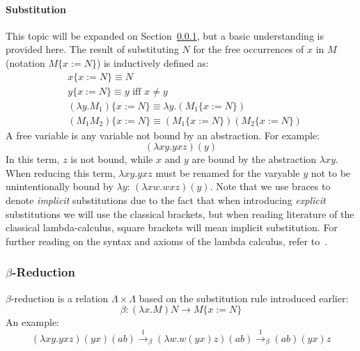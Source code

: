 \documentclass[11pt]{article}
\begin{document}
\paragraph{Substitution} This topic will be expanded on Section~\ref{reduction}, but a basic understanding is provided here.
The result of substituting $N$ for the free occurrences of $x$ in $M$ (notation $M \{ x:= N \} $) is inductively defined as:
\begin{equation*}
  \begin{split}
    & x\{ x := N \} \equiv N \\
    & y \{ x := N \} \equiv y \text{ iff } x \neq y \\
    & (\lambda y.M_{1}) \{ x:=N \} \equiv \lambda y. ( M_{1} \{ x:=N \} ) \\
    & (M_{1}M_{2}) \{ x:=N \} \equiv (M_{1}\{ x:=N \} )(M_{2} \{ x:=N \} )
  \end{split}
\end{equation*}
A free variable is any variable not bound by an abstraction. For example:
\begin{equation*}
  (\lambda x y . y x z ) (y)
\end{equation*}
In this term, $z$ is not bound,  while $x$ and $y$ are bound by the abstraction $\lambda xy$. When reducing this term, $\lambda x y . y x z$ must be renamed for the varyable $y$ not to be unintentionally bound
 by $\lambda y$: $(\lambda x w . w x z) (y)$.
Note that we use braces to denote \textit{implicit} substitutions due to the fact that when introducing \textit{explicit} substitutions we will use the classical brackets, but when reading literature of the classical lambda-calculus, square brackets will mean implicit substitution.
For further reading on the syntax and axioms of the lambda calculus, refer to~\cite{barendregt1984lambda}.

\subsubsection{$\beta$-Reduction}\label{reduction}
$\beta$-reduction is a relation $\Lambda \times \Lambda$ based on the substitution rule introduced earlier:
\begin{equation}
	\beta : ( \lambda x.M ) N \rightarrow M \{ x:=N \}
\end{equation}
An example:
\begin{equation*}
  ( \lambda xy. yxz ) (yx) (ab) \xrightarrow{1}_{\beta}  (\lambda w . w (yx) z ) (ab) \xrightarrow{1}_{\beta} (ab) (yx) z
\end{equation*}
\end{document}
